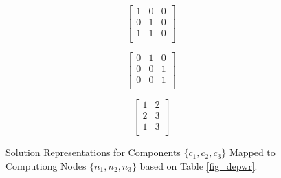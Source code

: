 \begin{figure}
	\centering
		\begin{minipage}{.5\textwidth}
		\centering
				\begin{minipage}{.3\textwidth}
				\centering
				\begin{equation*}
				\begin{bmatrix} 
				1 & 0& 0\\
				0 & 1& 0\\
				1 &  1& 0\\
				\end{bmatrix}
				\end{equation*}
			\end{minipage}%
			\begin{minipage}{.3\textwidth}
				\centering
				\begin{equation*}
				\begin{bmatrix} 
				0 & 1& 0\\
				0 & 0& 1\\
				0 &  0& 1\\
				\end{bmatrix}
				\end{equation*}
			\end{minipage}
		\label{fig_binary}
	\end{minipage}
	\begin{minipage}{.4\textwidth}
		\centering
		\begin{equation*}
		\begin{bmatrix} 
		1 & 2\\
		2& 3\\
		1& 3\\
		\end{bmatrix}
		\end{equation*}
		\label{fig_integer}
	\end{minipage}
		\caption{Solution Representations for Components $\{c_1,c_2,c_3\}$ Mapped to Computiong Nodes $\{n_1,n_2,n_3\}$ based on Table \ref{fig_depwr}.}
		\label{fig_solutionrep}
\end{figure}

